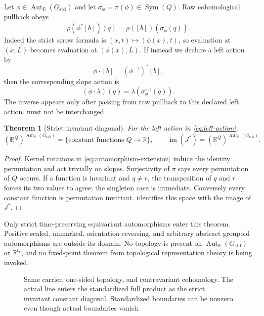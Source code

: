 \documentclass[11pt]{article}
\newtheorem{theorem}{Theorem}[section]
\theoremstyle{definition}
\newcommand{\R}{\mathbb R}
\newcommand{\Gstd}{G_{\mathrm{std}}}
\newcommand{\AutR}{\operatorname{Aut}_{\R}}
\newcommand{\Sym}{\operatorname{Sym}}
\newcommand{\im}{\operatorname{im}}
\begin{document}
Let $\phi\in\AutR(\Gstd)$ and let
$\sigma_\phi=\pi(\phi)\in\Sym(Q)$.  Raw cohomological pullback obeys
\begin{equation}
\label{eq:raw-pullback}
 \rho(\phi^*[b])(q)=\rho([b])(\sigma_\phi(q)).
\end{equation}
Indeed the strict arrow formula is $(x,t)\mapsto(\phi(x),t)$, so evaluation
at $(x,L)$ becomes evaluation at $(\phi(x),L)$.  If instead we declare a
left action by
\begin{equation}
\label{eq:left-action}
 \phi\mathbin{\cdot}[b]=(\phi^{-1})^*[b],
\end{equation}
then the corresponding slope action is
\begin{equation}
\label{eq:left-slope}
 (\phi\mathbin{\cdot}\lambda)(q)
 =\lambda(\sigma_\phi^{-1}(q)).
\end{equation}
The inverse appears only after passing from raw pullback to this declared
left action.   must not be
interchanged.

\begin{theorem}[Strict invariant diagonal]
\label{thm:invariant-diagonal}
For the left action in \cref{eq:left-action},
\begin{equation}
\label{eq:invariants}
 (\R^Q)^{\AutR(\Gstd)}
 =\{\text{constant functions }Q\to\R\},
 \qquad
 \im(J^*)=(\R^Q)^{\AutR(\Gstd)}.
\end{equation}
\end{theorem}

\begin{proof}
Kernel rotations in \cref{eq:automorphism-extension} induce the identity
permutation and act trivially on slopes.  Surjectivity of $\pi$ says every
permutation of $Q$ occurs.  If a function is invariant and $q\neq r$, the
transposition of $q$ and $r$ forces its two values to agree; the singleton
case is immediate.  Conversely every constant function is permutation
invariant.   identifies this space with
the image of $J^*$.
\end{proof}

Only strict time-preserving equivariant automorphisms enter this theorem.
Positive scaled, unmarked, orientation-reversing, and arbitrary abstract
groupoid automorphisms are outside its domain.  No topology is present on
$\AutR(\Gstd)$ or $\R^Q$, and no fixed-point theorem from topological
representation theory is being invoked.

\begin{figure}[t]
\centering
\resizebox{\textwidth}{!}{}
\caption{Same carrier, one-sided topology, and contravariant cohomology.
The actual line enters the standardized full product as the strict invariant
constant diagonal.  Standardized boundaries can be nonzero even though
actual boundaries vanish.}
\label{fig:same-carrier-diagonal}
\end{figure}
\end{document}
